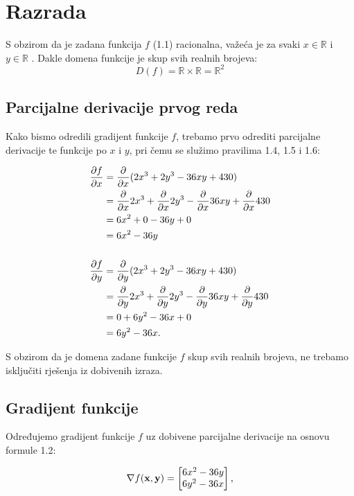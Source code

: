 \chapter{Razrada}

S obzirom da je zadana funkcija $f$ (1.1) racionalna, važeća je za svaki $x \in \mathbb{R}$ i $y \in \mathbb{R}$ \cite[vidi][stranica 119]{kolegij}.
Dakle domena funkcije je skup svih realnih brojeva:
$$
    D(f) = \mathbb{R} \times \mathbb{R} = \mathbb{R}^2
$$

\section{Parcijalne derivacije prvog reda}

Kako bismo odredili gradijent funkcije $f$, trebamo prvo odrediti parcijalne derivacije te funkcije po $x$ i $y$, pri čemu se služimo pravilima 1.4, 1.5 i 1.6:

\begin{align*}
    \frac{\partial f}{\partial x} & = \frac{\partial}{\partial x} (2x^3 + 2y^3 - 36xy + 430) \\
    & = \frac{\partial}{\partial x} 2x^3 + \frac{\partial}{\partial x}2y^3 - \frac{\partial}{\partial x}36xy + \frac{\partial}{\partial x}430 \\
    & = 6x^2 + 0 - 36y + 0 \\
    & = 6x^2 - 36y \\
    \\
    \frac{\partial f}{\partial y} & = \frac{\partial}{\partial y} (2x^3 + 2y^3 - 36xy + 430) \\
    & = \frac{\partial}{\partial y} 2x^3 + \frac{\partial}{\partial y}2y^3 - \frac{\partial}{\partial y}36xy + \frac{\partial}{\partial y}430 \\
    & = 0 + 6y^2 - 36x + 0\\
    & = 6y^2 - 36x \textnormal{.}
\end{align*}

S obzirom da je domena zadane funkcije $f$ skup svih realnih brojeva, ne trebamo isključiti rješenja iz dobivenih izraza.

\section{Gradijent funkcije}

Određujemo gradijent funkcije $f$ uz dobivene parcijalne derivacije na osnovu formule 1.2:

\begin{equation}
    \nabla f(\mathbf{x}, \mathbf{y}) = \begin{bmatrix}
        6x^2 - 36y \\
        6y^2 - 36x
    \end{bmatrix}\textnormal{,}
\end{equation}

